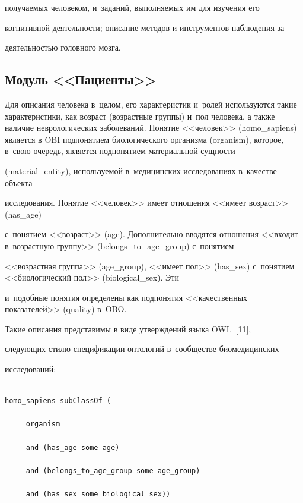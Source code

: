 получаемых человеком, и~заданий, выполняемых им для изучения его 

когнитивной деятельности; описание методов и инструментов наблюдения за 

деятельностью головного мозга. 



\subsection{Модуль <<Пациенты>>}



      Для описания человека в~целом, его характеристик и~ролей используются такие характеристики, как возраст (возрастные группы) и~пол человека, а также наличие неврологических заболеваний. Понятие <<человек>> (homo\_sapiens) является в OBI подпонятием биологического организма (organism), которое, в~свою очередь, является подпонятием материальной сущности 

      (material\_entity), используемой в~медицинских исследованиях в~качестве объекта 

      исследования. Понятие <<человек>> имеет отношения <<имеет возраст>> (has\_age) 

с~понятием <<возраст>> (age). Дополнительно вводятся отношения <<входит в~возрастную группу>> (belongs\_to\_age\_group) с~понятием 

<<возрастная группа>> (age\_group), <<имеет пол>> (has\_sex) с~понятием <<биологический пол>> (biological\_sex). Эти 

и~подобные понятия определены как подпонятия <<качественных показателей>> (quality) в~OBO.

      

      

      Такие описания представимы в виде утверждений языка OWL~[11],

 сле\-ду\-ющих стилю спецификации онтологий в~сообществе биомедицинских 

исследований:

      \begin{verbatim}

homo_sapiens subClassOf (

     organism

     and (has_age some age)

     and (belongs_to_age_group some age_group)

     and (has_sex some biological_sex))

\end{verbatim}



